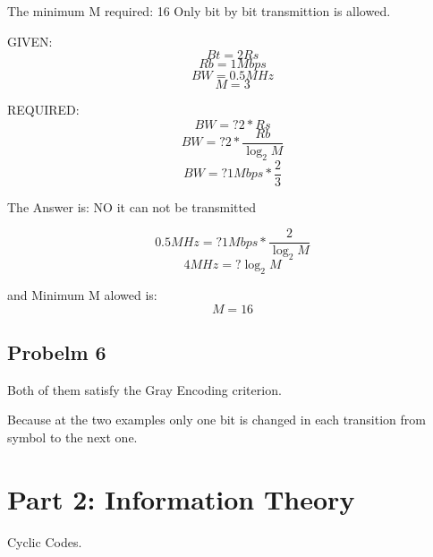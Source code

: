 \documentclass[a4paper,12pt]{report}
\begin{document}
        The minimum M required: 16
        Only bit by bit transmittion is allowed.

        GIVEN:
        \begin{equation*}
            Bt = 2Rs
        \end{equation*}
        \begin{equation*}
            Rb = 1 Mbps
        \end{equation*}
        \begin{equation*}
            BW = 0.5 MHz
        \end{equation*}
        \begin{equation*}
            M = 3
        \end{equation*}

        REQUIRED:
        \begin{equation*}
            BW =? 2 * Rs
        \end{equation*}
        \begin{equation*}
            BW =? 2 * \frac{Rb}{\log_2 M}
        \end{equation*}
        \begin{equation*}
            BW =? 1Mbps * \frac{2}{3}
        \end{equation*}

        The Answer is: NO it can not be transmitted
        
        \begin{equation*}
            0.5MHz =? 1Mbps * \frac{2}{\log_2 M}
        \end{equation*}
        \begin{equation*}
            4MHz =? \log_2 M
        \end{equation*}

        and Minimum M alowed is:
        \begin{equation*}
            M = 16
        \end{equation*}
        
    \subsection{Probelm 6}
        Both of them satisfy the Gray Encoding criterion.

        Because at the two examples only one bit is changed in each transition from symbol to the next one.

    \newpage

    \section{Part 2: Information Theory}
        Cyclic Codes.
\end{document}
